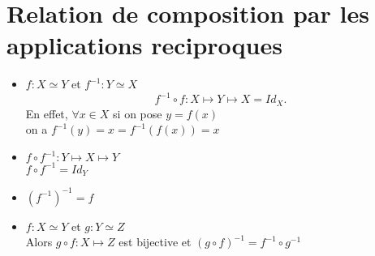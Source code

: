 \documentclass[../main.tex]{subfiles}
\begin{document}
\section{Relation de composition par les applications reciproques}

\begin{itemize}
	\item$f: X \simeq Y$ et  $ f^{-1}: Y \simeq X$ \\
\[ 
	f^{-1} \circ f: X \mapsto Y \mapsto X = Id_{X}.
\]
En effet, $\forall x \in X$ si on pose $y = f(x)$ \\
on a $f^{-1} ( y) = x = f^{-1}(f(x)) = x$
\item $f \circ f^{-1}: Y \mapsto X \mapsto Y$ \\
	$f\circ f^{-1} = Id_Y$ \\
\item $ ( f^{-1})^{-1} =f$ 
\item $f: X \simeq Y$ et $g: Y \simeq Z$ \\
	Alors $g\circ f: X \mapsto Z$ est bijective et $ ( g\circ f)^{-1} = f^{-1} \circ g^{-1}$

\end{itemize}
\end{document}
